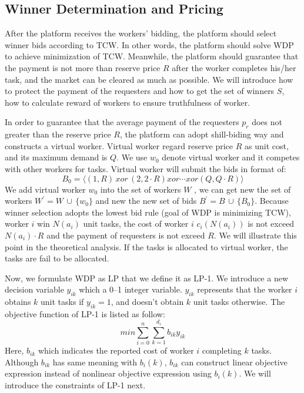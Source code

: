 \subsection{Winner Determination and Pricing}
After the platform receives the workers' bidding, the platform should select winner bids according to TCW. In other words, the platform should solve WDP to achieve minimization of TCW. Meanwhile, the platform should guarantee that the payment is not more than reserve price $R$ after the worker completes his/her task, and the market can be cleared as much as possible. We will introduce how to protect the payment of the requesters and how to get the set of winners $S$, how to calculate reward of workers to ensure truthfulness of worker.

In order to guarantee that the average payment of the requesters $p_r$ does not greater than the reserve price $R$, the platform can adopt shill-biding way\cite{Cramton2006Combinatorial} and constructs a virtual worker. Virtual worker regard reserve price $R$ as unit cost, and its maximum demand is $Q$. We use $w_0$ denote virtual worker and it competes with other workers for tasks. Virtual worker will submit the bids in format of:
$$B_0 = \langle(1,R)\,xor\,(2,2\cdot R)xor \cdots xor(Q,Q \cdot R)\rangle$$
We add virtual worker $w_0$ into the set of workers $W$ , we can get new the set of workers $W^{'} = W \, \cup \, \{w_0\}$ and new the new set of bids $B^{'} = B \, \cup \, \{B_0\}$. Because winner selection adopts the lowest bid rule (goal of WDP is minimizing TCW), worker $i$ win $N(a_i)$ unit tasks, the cost of worker $i$ $c_i(N(a_i))$ is not exceed $N(a_i) \cdot R$ and the payment of requesters is not exceed $R$. We will illustrate this point in the theoretical analysis. If the tasks is allocated to virtual worker, the tasks are fail to be allocated.

Now, we formulate WDP as LP that we define it as LP-1. We introduce a new decision variable $y_{ik}$ which a 0–1 integer variable. $y_{ik}$ represents that the worker $i$ obtains $k$ unit tasks if $y_{ik} = 1$, and doesn't obtain $k$ unit tasks otherwise. The objective function of LP-1 is listed as follow:
\begin{equation}\label{eq5}
  min \sum_{i=0}^{n}\sum_{k=1}^{d_i}b_{ik}y_{ik}
\end{equation}
Here, $b_{ik}$ which indicates the reported cost of worker $i$ completing $k$ tasks. Although $b_{ik}$ has same meaning with $b_i(k)$, $b_{ik}$ can construct linear objective expression instead of nonlinear objective expression using $b_i(k)$. We will introduce the constraints of LP-1 next.

